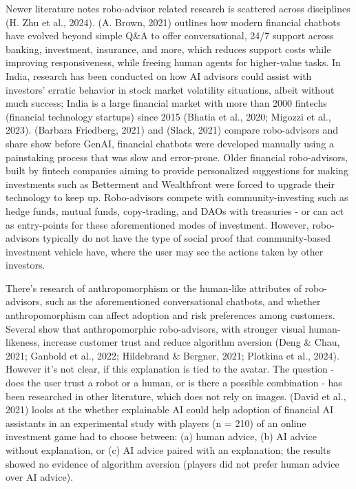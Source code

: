 \documentclass[
  12pt,
  letterpaper,
  DIV=11,
  numbers=noendperiod]{scrartcl}
\begin{document}
Newer literature notes robo-advisor related research is scattered across
disciplines (H. Zhu et al., 2024). (A. Brown, 2021) outlines how modern
financial chatbots have evolved beyond simple Q\&A to offer
conversational, 24/7 support across banking, investment, insurance, and
more, which reduces support costs while improving responsiveness, while
freeing human agents for higher-value tasks. In India, research has been
conducted on how AI advisors could assist with investors' erratic
behavior in stock market volatility situations, albeit without much
success; India is a large financial market with more than 2000 fintechs
(financial technology startups) since 2015 (Bhatia et al., 2020; Migozzi
et al., 2023). (Barbara Friedberg, 2021) and (Slack, 2021) compare
robo-advisors and share show before GenAI, financial chatbots were
developed manually using a painstaking process that was slow and
error-prone. Older financial robo-advisors, built by fintech companies
aiming to provide personalized suggestions for making investments such
as Betterment and Wealthfront were forced to upgrade their technology to
keep up. Robo-advisors compete with community-investing such as hedge
funds, mutual funds, copy-trading, and DAOs with treasuries - or can act
as entry-points for these aforementioned modes of investment. However,
robo-advisors typically do not have the type of social proof that
community-based investment vehicle have, where the user may see the
actions taken by other investors.

There's research of anthropomorphism or the human-like attributes of
robo-advisors, such as the aforementioned conversational chatbots, and
whether anthropomorphism can affect adoption and risk preferences among
customers. Several show that anthropomorphic robo-advisors, with
stronger visual human-likeness, increase customer trust and reduce
algorithm aversion (Deng \& Chau, 2021; Ganbold et al., 2022; Hildebrand
\& Bergner, 2021; Plotkina et al., 2024). However it's not clear, if
this explanation is tied to the avatar. The question - does the user
trust a robot or a human, or is there a possible combination - has been
researched in other literature, which does not rely on images. (David et
al., 2021) looks at the whether explainable AI could help adoption of
financial AI assistants in an experimental study with players (n = 210)
of an online investment game had to choose between: (a) human advice,
(b) AI advice without explanation, or (c) AI advice paired with an
explanation; the results showed no evidence of algorithm aversion
(players did not prefer human advice over AI advice).
\end{document}
